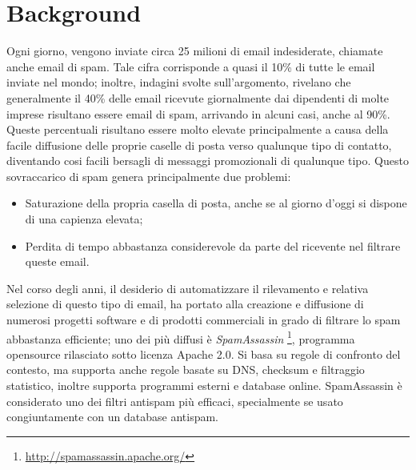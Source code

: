 \section{Background}\label{Background}
Ogni giorno, vengono inviate circa 25 milioni di email indesiderate, chiamate anche email di spam. Tale cifra corrisponde a quasi il 10\% di tutte le email inviate nel mondo; inoltre, indagini svolte sull'argomento, rivelano che generalmente il 40\% delle email ricevute giornalmente dai dipendenti di molte imprese risultano essere email di spam, arrivando in alcuni casi, anche al 90\%.
Queste percentuali risultano essere molto elevate principalmente a causa della facile diffusione delle proprie caselle di posta verso qualunque tipo di contatto, diventando cosi facili bersagli di messaggi promozionali di qualunque tipo. Questo sovraccarico di spam genera principalmente due problemi:
\begin{itemize}
\item Saturazione della propria casella di posta, anche se al giorno d'oggi si dispone di una capienza elevata;
\item Perdita di tempo abbastanza considerevole da parte del ricevente nel filtrare queste email.
\end{itemize}
Nel corso degli anni, il desiderio di automatizzare il rilevamento e relativa selezione di questo tipo di email, ha portato alla creazione e diffusione di numerosi progetti software e di prodotti commerciali in grado di filtrare lo spam abbastanza efficiente; uno dei più diffusi è \textit{SpamAssassin} \footnote{\url{http://spamassassin.apache.org/}}, programma opensource rilasciato sotto licenza Apache 2.0. Si basa su regole di confronto del contesto, ma supporta anche regole basate su DNS, checksum e filtraggio statistico, inoltre supporta programmi esterni e database online.
SpamAssassin è considerato uno dei filtri antispam più efficaci, specialmente se usato congiuntamente con un database antispam.\cite{wiki:SpamAssassin}

